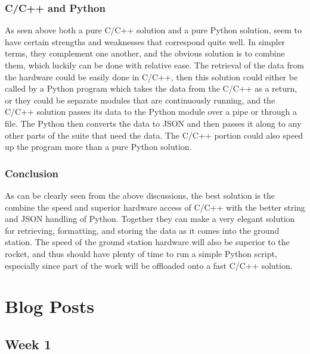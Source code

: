 \documentclass[onecolumn, draftclsnofoot,10pt, compsoc]{IEEEtran}
\begin{document}
\subsubsection{C/C++ and Python}
As seen above both a pure C/C++ solution and a pure Python solution, seem to have certain strengths and weaknesses that correspond quite well. In simpler terms, they complement one another, and the obvious solution is to combine them, which luckily can be done with relative ease. The retrieval of the data from the hardware could be easily done in C/C++, then this solution could either be called by a Python program which takes the data from the C/C++ as a return, or they could be separate modules that are continuously running, and the C/C++ solution passes its data to the Python module over a pipe or through a file. The Python then converts the data to JSON and then passes it along to any other parts of the suite that need the data. The C/C++ portion could also speed up the program more than a pure Python solution.
\subsubsection{Conclusion}
As can be clearly seen from the above discussions, the best solution is the combine the speed and superior hardware access of C/C++ with the better string and JSON handling of Python. Together they can make a very elegant solution for retrieving, formatting, and storing the data as it comes into the ground station. The speed of the ground station hardware will also be superior to the rocket, and thus should have plenty of time to run a simple Python script, especially since part of the work will be offloaded onto a fast C/C++ solution\cite{refgs}.

\section{Blog Posts}
\subsection {Week 1}
\end{document}
